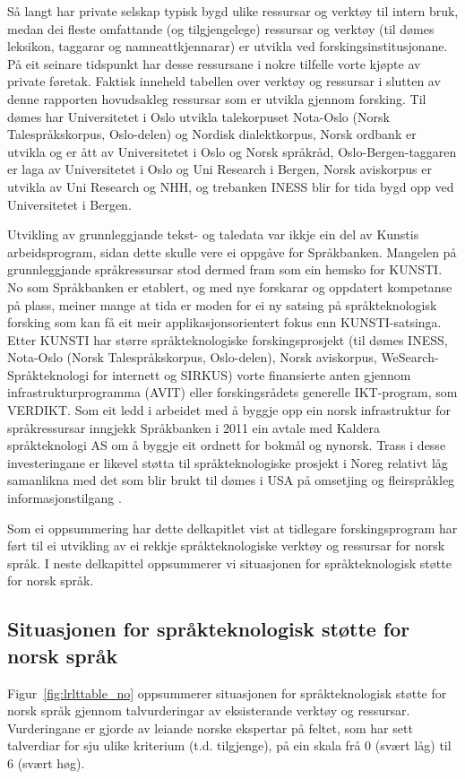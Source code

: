 \begin{multicols}{2}
Så langt har private selskap typisk bygd ulike ressursar og verktøy til intern bruk, medan dei fleste omfattande (og tilgjengelege) ressursar og verktøy (til dømes leksikon, taggarar og namneattkjennarar) er utvikla ved forskingsinstitusjonane. På eit seinare tidspunkt har desse ressursane i nokre tilfelle vorte kjøpte av private føretak. Faktisk inneheld tabellen over verktøy og ressursar i slutten av denne rapporten hovudsakleg ressursar som er utvikla gjennom forsking. Til dømes har Universitetet i Oslo utvikla talekorpuset Nota-Oslo (Norsk Talespråkskorpus, Oslo-delen) og Nordisk dialektkorpus, Norsk ordbank er utvikla og er ått av Universitetet i Oslo og Norsk språkråd, Oslo-Bergen-taggaren er laga av Universitetet i Oslo og Uni Research i Bergen, Norsk aviskorpus er utvikla av Uni Research og NHH, og trebanken INESS blir for tida bygd opp ved Universitetet i Bergen.

Utvikling av grunnleggjande tekst- og taledata var ikkje ein del av Kunstis arbeidsprogram, sidan dette skulle vere ei oppgåve for Språkbanken. Mangelen på grunnleggjande språkressursar stod dermed fram som ein hemsko for KUNSTI. No som Språkbanken er etablert, og med nye forskarar og oppdatert kompetanse på plass, meiner mange at tida er moden for ei ny satsing på språkteknologisk forsking som kan få eit meir applikasjonsorientert fokus enn KUNSTI-satsinga. Etter KUNSTI har større språkteknologiske forskingsprosjekt (til dømes INESS, Nota-Oslo (Norsk Talespråkskorpus, Oslo-delen), Norsk aviskorpus, WeSearch-Språkteknologi for internett og SIRKUS) vorte finansierte anten gjennom infrastrukturprogramma (AVIT) eller forskingsrådets generelle IKT-program, som VERDIKT. 
Som eit ledd i arbeidet med å byggje opp ein norsk infrastruktur for språkressursar inngjekk Språkbanken i 2011 ein avtale med Kaldera språkteknologi AS om å byggje eit ordnett for bokmål og nynorsk. Trass i desse investeringane er likevel støtta til språkteknologiske prosjekt i Noreg relativt låg samanlikna med det som blir brukt til dømes i USA på omsetjing og fleirspråkleg informasjonstilgang \cite{laz1}.

Som ei oppsummering har dette delkapitlet vist at tidlegare forskingsprogram har ført til ei utvikling av ei rekkje språkteknologiske verktøy og ressursar for norsk språk. 
I neste delkapittel oppsummerer vi situasjonen for språkteknologisk støtte for norsk språk. 

\subsection{Situasjonen for språkteknologisk støtte for norsk språk}
Figur~\ref{fig:lrlttable_no} oppsummerer situasjonen for språkteknologisk støtte for norsk språk gjennom talvurderingar av eksisterande verktøy og ressursar. Vurderingane er gjorde av leiande norske ekspertar på feltet, som har sett talverdiar for sju ulike kriterium (t.d. tilgjenge), på ein skala frå 0 (svært låg) til 6 (svært høg).


\end{multicols}
